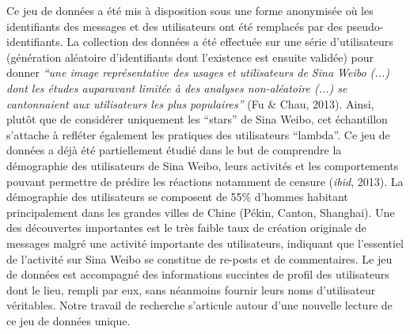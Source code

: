 Ce jeu de donn\'ees a \'et\'e mis \`a disposition sous une forme
anonymis\'ee o\`u les identifiants des messages et des utilisateurs ont
\'et\'e remplac\'es par des pseudo-identifiants. La collection des
donn\'ees a \'et\'e effectu\'ee sur une s\'erie
d{\textquoteright}utilisateurs (g\'en\'eration al\'eatoire
d{\textquoteright}identifiants dont l{\textquoteright}existence est
ensuite valid\'ee) pour donner \textit{{\textquotedblleft}une image
repr\'esentative des usages et utilisateurs de Sina Weibo (...) dont
les \'etudes auparavant limit\'ee \`a des analyses non-al\'eatoire
(...) se cantonnaient aux utilisateurs les plus
populaires{\textquotedblright} }(Fu \& Chau, 2013). Ainsi, plut\^ot que
de consid\'erer uniquement les
{\textquotedblleft}stars{\textquotedblright} de Sina Weibo, cet
\'echantillon s{\textquoteright}attache \`a refl\'eter \'egalement les
pratiques des utilisateurs
{\textquotedblleft}lambda{\textquotedblright}. Ce jeu de donn\'ees a
d\'ej\`a \'et\'e partiellement \'etudi\'e dans le but de comprendre la
d\'emographie des utilisateurs de Sina Weibo, leurs activit\'es et les
comportements pouvant permettre de pr\'edire les r\'eactions notamment
de censure (\textit{ibid}, 2013). La d\'emographie des utilisateurs se
composent de 55\% d{\textquoteright}hommes habitant principalement dans
les grandes villes de Chine (P\'ekin, Canton, Shanghai). Une des
d\'ecouvertes importantes est le tr\`es faible taux de cr\'eation
originale de messages malgr\'e une activit\'e importante des
utilisateurs, indiquant que l{\textquoteright}essentiel de
l{\textquoteright}activit\'e sur Sina Weibo se constitue de re-posts et
de commentaires. Le jeu de donn\'ees est accompagn\'e des informations
succintes de profil des utilisateurs dont le lieu, rempli par eux, sans
n\'eanmoins fournir leurs noms d{\textquoteright}utilisateur
v\'eritables. Notre travail de recherche s{\textquoteright}articule
autour d{\textquoteright}une nouvelle lecture de ce jeu de donn\'ees
unique.

